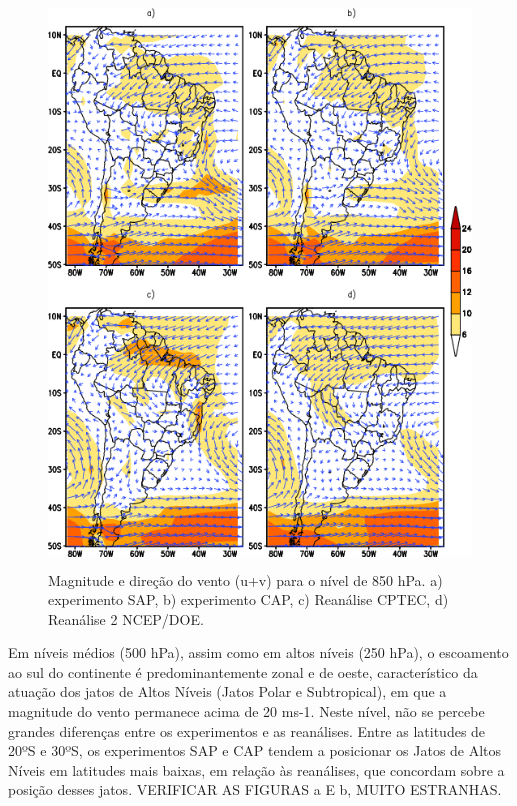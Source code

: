 \begin{figure}[!hbp]
\centering
\includegraphics[height=15cm]{./figs/media_ventos_anl_850hPa.png}
\caption{Magnitude e direção do vento (u+v) para o nível de 850 hPa. a) experimento SAP, b) experimento CAP, c) Reanálise CPTEC, d) Reanálise 2 NCEP/DOE.}
\label{fig34}
\end{figure}

Em níveis médios (500 hPa), assim como em altos níveis (250 hPa), o escoamento ao sul do continente é predominantemente zonal e de oeste, característico da atuação dos jatos de Altos Níveis (Jatos Polar e Subtropical), em que a magnitude do vento permanece acima de 20 ms-1. Neste nível, não se percebe grandes diferenças entre os experimentos e as reanálises. Entre as latitudes de 20ºS e 30ºS, os experimentos SAP e CAP tendem a posicionar os Jatos de Altos Níveis em latitudes mais baixas, em relação às reanálises, que concordam sobre a posição desses jatos. VERIFICAR AS FIGURAS a E b, MUITO ESTRANHAS.

